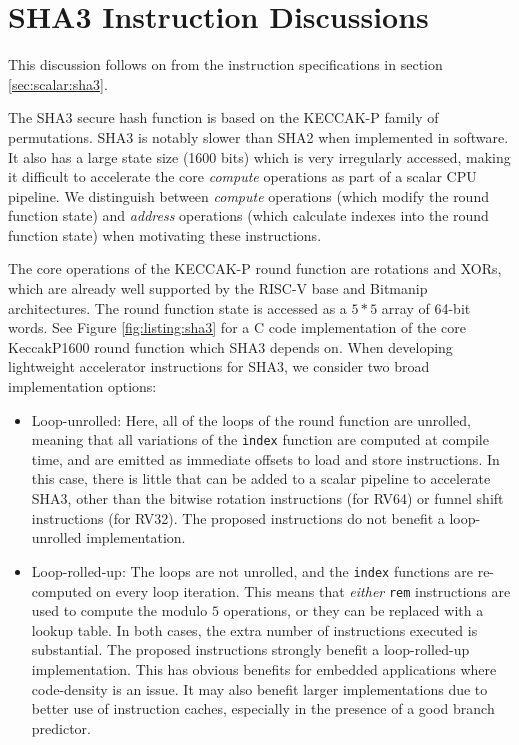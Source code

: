 
\section{SHA3 Instruction Discussions}
\label{sec:appendix:sha3}

This discussion follows on from the instruction specifications
in section
\ref{sec:scalar:sha3}.

The SHA3 secure hash function \cite{nist:fips:202} is based on
the KECCAK-P family of permutations.
SHA3 is notably slower than SHA2 when implemented in software.
It also has a large state size (1600 bits) which is very irregularly
accessed, making it difficult to accelerate
the core {\em compute} operations as part of a scalar CPU pipeline.
We distinguish between {\em compute} operations (which modify the
round function state) and {\em address} operations (which calculate
indexes into the round function state) when motivating these instructions.

The core operations of the KECCAK-P round function are rotations
and XORs, which are already well supported by the RISC-V
base and Bitmanip architectures.
The round function state is accessed as a $5*5$ array of
64-bit words.
See Figure \ref{fig:listing:sha3} for a C code implementation of
the core KeccakP1600 round function which SHA3 depends on.
When developing lightweight accelerator instructions for SHA3, we
consider two broad implementation options:

\begin{itemize}
\item Loop-unrolled: Here, all of the loops of the round function are
    unrolled, meaning that all variations of the \lstinline{index}
    function are computed at compile time, and are emitted as immediate
    offsets to load and store instructions.
    In this case, there is little that can be added to a scalar
    pipeline to accelerate SHA3, other than the bitwise rotation instructions
    (for RV64) or funnel shift instructions (for RV32).
    The proposed instructions do not benefit a loop-unrolled implementation.
\item Loop-rolled-up: The loops are not unrolled, and the
    \lstinline{index} functions are re-computed on every loop iteration.
    This means that {\em either} {\tt rem} instructions are used to
    compute the modulo $5$ operations, or they can be replaced with a
    lookup table.
    In both cases, the extra number of instructions executed is
    substantial.
    The proposed instructions strongly benefit a loop-rolled-up
    implementation.
    This has obvious benefits for embedded applications where code-density
    is an issue.
    It may also benefit larger implementations due to better use of
    instruction caches, especially in the presence of a good branch
    predictor.
\end{itemize}

